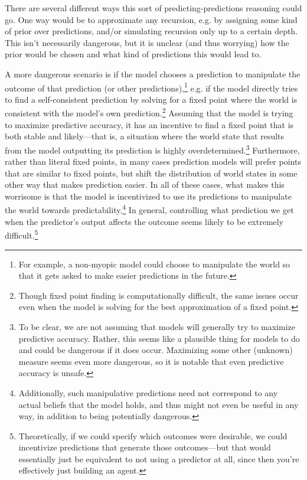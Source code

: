 \documentclass[
  onecolumn,
  natbib,
]{miri-tech-article}
\begin{document}
There are several different ways this sort of predicting-predictions reasoning could go. One way would be to approximate any recursion, e.g. by assigning some kind of prior over predictions, and/or simulating recursion only up to a certain depth. This isn't necessarily dangerous, but it is  unclear (and thus worrying) how the prior would be chosen and what kind of predictions this would lead to.

A more dangerous scenario is if the model chooses a prediction to manipulate the outcome of that prediction (or other predictions),\footnote{For example, a non-myopic model could choose to manipulate the world so that it gets asked to make easier predictions in the future.} e.g. if the model directly tries to find a self-consistent prediction by solving for a fixed point where the world is consistent with the model's own prediction\cite{training_goals_llms}.\footnote{Though fixed point finding is computationally difficult, the same issues occur even when the model is solving for the best approximation of a fixed point.} Assuming that the model is trying to maximize predictive accuracy, it has an incentive to find a fixed point that is both stable and likely---that is, a situation where the world state that results from the model outputting its prediction is highly overdetermined.\footnote{To be clear, we are not assuming that models will generally try to maximize predictive accuracy. Rather, this seems like a plausible thing for models to do and could be dangerous if it does occur. Maximizing some other (unknown) measure seems even more dangerous, so it is notable that even predictive accuracy is unsafe.} Furthermore, rather than literal fixed points, in many cases prediction models will prefer points that are similar to fixed points, but shift the distribution of world states in some other way\cite{proper_scoring_rules_dont_guarantee} that makes prediction easier. In all of these cases, what makes this worrisome is that the model is incentivized to use its predictions to manipulate the world towards predictability.\footnote{Additionally, such manipulative predictions need not correspond to any actual beliefs that the model holds, and thus might not even be useful in any way, in addition to being potentially dangerous.} In general, controlling what prediction we get when the predictor's output affects the outcome seems likely to be extremely difficult.\footnote{Theoretically, if we could specify which outcomes were desirable, we could incentivize predictions that generate those outcomes---but that would essentially just be equivalent to not using a predictor at all, since then you're effectively just building an agent.}
\end{document}
